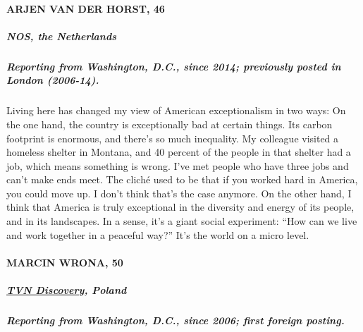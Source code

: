 \hypertarget{arjen-van-der-horst-46}{%
\paragraph{ARJEN VAN DER HORST, 46}\label{arjen-van-der-horst-46}}

\hypertarget{nos-the-netherlands-1}{%
\subparagraph{\texorpdfstring{\textbf{NOS, the
Netherlands}}{NOS, the Netherlands}}\label{nos-the-netherlands-1}}

\hypertarget{reporting-from-washington-dc-since-2014-previously-posted-in-london-2006-14}{%
\subparagraph{\texorpdfstring{\textbf{Reporting from Washington, D.C.,
since 2014; previously posted in London
(2006-14).}}{Reporting from Washington, D.C., since 2014; previously posted in London (2006-14).}}\label{reporting-from-washington-dc-since-2014-previously-posted-in-london-2006-14}}

Living here has changed my view of American exceptionalism in two ways:
On the one hand, the country is exceptionally bad at certain things. Its
carbon footprint is enormous, and there's so much inequality. My
colleague visited a homeless shelter in Montana, and 40 percent of the
people in that shelter had a job, which means something is wrong. I've
met people who have three jobs and can't make ends meet. The cliché used
to be that if you worked hard in America, you could move up. I don't
think that's the case anymore. On the other hand, I think that America
is truly exceptional in the diversity and energy of its people, and in
its landscapes. In a sense, it's a giant social experiment: ``How can we
live and work together in a peaceful way?'' It's the world on a micro
level.

\hypertarget{marcin-wrona-50}{%
\paragraph{MARCIN WRONA, 50}\label{marcin-wrona-50}}

\hypertarget{tvn-discovery-poland}{%
\subparagraph{\texorpdfstring{\textbf{\href{https://www.tvn.pl/}{TVN
Discovery},
Poland}}{TVN Discovery, Poland}}\label{tvn-discovery-poland}}

\hypertarget{reporting-from-washington-dc-since-2006-first-foreign-posting-1}{%
\subparagraph{\texorpdfstring{\textbf{Reporting from Washington, D.C.,
since 2006; first foreign
posting.}}{Reporting from Washington, D.C., since 2006; first foreign posting.}}\label{reporting-from-washington-dc-since-2006-first-foreign-posting-1}}

